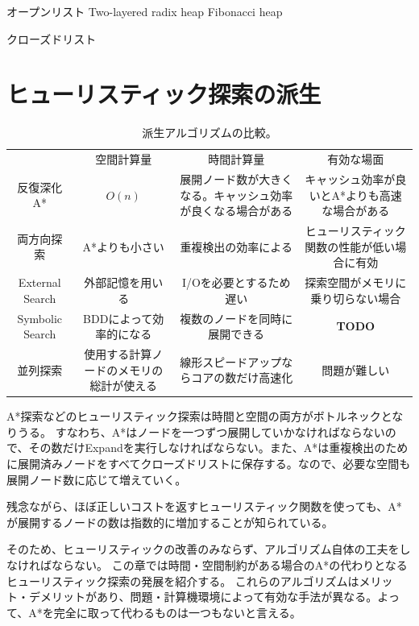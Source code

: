 \documentclass[10pt]{book}
\newcommand{\TODO}{{\bf TODO}}
\begin{document}
オープンリスト
Two-layered radix heap
Fibonacci heap

クローズドリスト


\chapter{ヒューリスティック探索の派生}
\label{ch:heuristic-search-variants}

\begin{table}
\caption{派生アルゴリズムの比較。}
\label{tbl:search-variants}
\begin{tabular}{cccc}
					& 空間計算量	& 時間計算量 & 有効な場面 \\
	反復深化A*		& $O(n)$  	& 展開ノード数が大きくなる。キャッシュ効率が良くなる場合がある & キャッシュ効率が良いとA*よりも高速な場合がある \\
	両方向探索 		& A*よりも小さい	& 重複検出の効率による & ヒューリスティック関数の性能が低い場合に有効 \\
	External Search & 外部記憶を用いる & I/Oを必要とするため遅い & 探索空間がメモリに乗り切らない場合 \\
	Symbolic Search & BDDによって効率的になる & 複数のノードを同時に展開できる & \TODO \\
	並列探索 			& 使用する計算ノードのメモリの総計が使える & 線形スピードアップならコアの数だけ高速化 & 問題が難しい \\
\end{tabular}
\end{table}


A*探索などのヒューリスティック探索は時間と空間の両方がボトルネックとなりうる。
すなわち、A*はノードを一つずつ展開していかなければならないので、その数だけExpandを実行しなければならない。また、A*は重複検出のために展開済みノードをすべてクローズドリストに保存する。なので、必要な空間も展開ノード数に応じて増えていく。

残念ながら、ほぼ正しいコストを返すヒューリスティック関数を使っても、A*が展開するノードの数は指数的に増加することが知られている\cite{helmert:08}。

そのため、ヒューリスティックの改善のみならず、アルゴリズム自体の工夫をしなければならない。
この章では時間・空間制約がある場合のA*の代わりとなるヒューリスティック探索の発展を紹介する。
これらのアルゴリズムはメリット・デメリットがあり、問題・計算機環境によって有効な手法が異なる。よって、A*を完全に取って代わるものは一つもないと言える。
\end{document}
